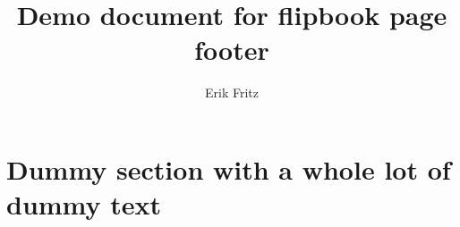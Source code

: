 \documentclass[10pt,a4paper]{article}
\author{Erik Fritz}
\title{Demo document for flipbook page footer}
\begin{document}
\maketitle

\newpage

\section{Dummy section with a whole lot of dummy text}

\lipsum[1-50]
\end{document}

